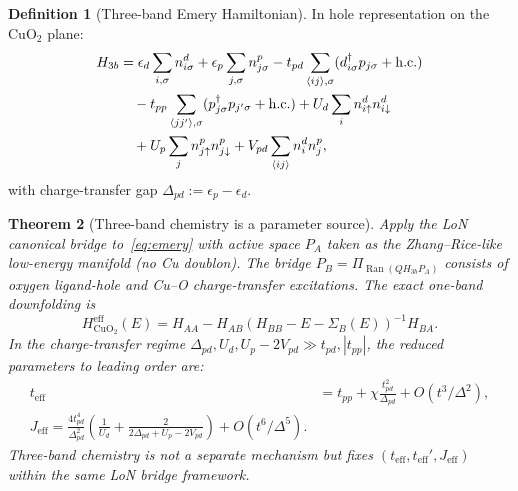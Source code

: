 \documentclass[12pt]{article}
\theoremstyle{plain}
\newtheorem{theorem}{Theorem}[section]
\theoremstyle{definition}
\newtheorem{definition}[theorem]{Definition}
\numberwithin{equation}{section}
\newcommand{\eff}{\mathrm{eff}}
\DeclareMathOperator{\Ran}{Ran}
\begin{document}
\begin{definition}[Three-band Emery Hamiltonian]
In hole representation on the CuO$_2$ plane:
\begin{align}\label{eq:emery}
H_{3b} &= \epsilon_d\sum_{i,\sigma}n_{i\sigma}^d
+ \epsilon_p\sum_{j,\sigma}n_{j\sigma}^p
- t_{pd}\sum_{\langle ij\rangle,\sigma}
(d_{i\sigma}^\dagger p_{j\sigma}+\mathrm{h.c.})\notag\\
&\quad - t_{pp}\sum_{\langle jj'\rangle,\sigma}
(p_{j\sigma}^\dagger p_{j'\sigma}+\mathrm{h.c.})
+ U_d\sum_i n_{i\uparrow}^d n_{i\downarrow}^d\notag\\
&\quad + U_p\sum_j n_{j\uparrow}^p n_{j\downarrow}^p
+ V_{pd}\sum_{\langle ij\rangle}n_i^d n_j^p,
\end{align}
with charge-transfer gap $\Delta_{pd}:=\epsilon_p-\epsilon_d$.
\end{definition}

\begin{theorem}[Three-band chemistry is a parameter source]\label{thm:threeband}
Apply the LoN canonical bridge to~\eqref{eq:emery} with active
space $P_A$ taken as the Zhang--Rice-like low-energy manifold
(no Cu doublon).  The bridge $P_B=\Pi_{\Ran(QH_{3b}P_A)}$
consists of oxygen ligand-hole and Cu--O charge-transfer
excitations.  The exact one-band downfolding is
\begin{equation}
H_{\mathrm{CuO}_2}^{\eff}(E) = H_{AA}
- H_{AB}(H_{BB}-E-\Sigma_B(E))^{-1}H_{BA}.
\end{equation}
In the charge-transfer regime
$\Delta_{pd},U_d,U_p-2V_{pd}\gg t_{pd},|t_{pp}|$,
the reduced parameters to leading order are:
\begin{align}
t_{\eff} &= t_{pp} + \chi\frac{t_{pd}^2}{\Delta_{pd}}
+ O(t^3/\Delta^2),\label{eq:teff}\\
\boxed{J_{\eff} = \frac{4t_{pd}^4}{\Delta_{pd}^2}
\left(\frac{1}{U_d}+\frac{2}{2\Delta_{pd}+U_p-2V_{pd}}\right)
+ O(t^6/\Delta^5).}\label{eq:Jeff}
\end{align}
Three-band chemistry is not a separate mechanism but fixes
$(t_{\eff},t_{\eff}',J_{\eff})$ within the same LoN bridge
framework.
\end{theorem}
\end{document}
